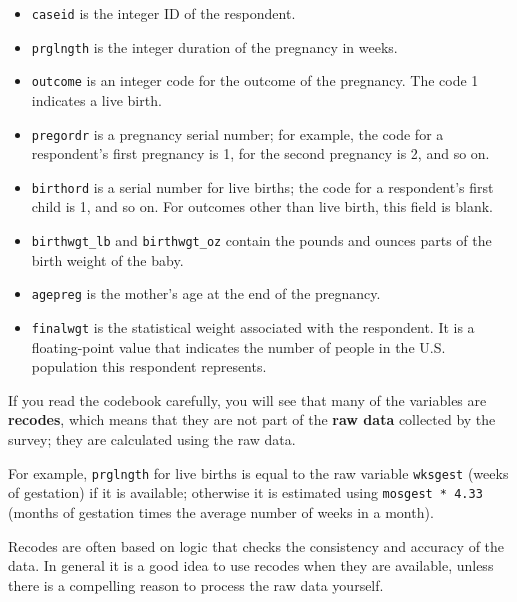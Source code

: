 \documentclass[12pt]{book}
\begin{document}
\begin{itemize}

\item \verb"caseid" is the integer ID of the respondent.

\item \verb"prglngth" is the integer duration of the pregnancy in weeks.

\item \verb"outcome" is an integer code for the outcome of the
  pregnancy.  The code 1 indicates a live birth.

\item \verb"pregordr" is a pregnancy serial number; for example, the
  code for a respondent's first pregnancy is 1, for the second
  pregnancy is 2, and so on.

\item \verb"birthord" is a serial number for live
  births; the code for a respondent's first child is 1, and so on.
  For outcomes other than live birth, this field is blank.

\item \verb"birthwgt_lb" and \verb"birthwgt_oz" contain the pounds and
  ounces parts of the birth weight of the baby.

\item \verb"agepreg" is the mother's age at the end of the pregnancy.

\item \verb"finalwgt" is the statistical weight associated with the
  respondent.  It is a floating-point value that indicates the number
  of people in the U.S. population this respondent represents.

\end{itemize}

If you read the codebook carefully, you will see that many of the
variables are {\bf recodes}, which means that they are not part of the
{\bf raw data} collected by the survey; they are calculated using
the raw data.   

For example, \verb"prglngth" for live births is equal to the raw
variable \verb"wksgest" (weeks of gestation) if it is available;
otherwise it is estimated using \verb"mosgest * 4.33" (months of
gestation times the average number of weeks in a month).

Recodes are often based on logic that checks the consistency and
accuracy of the data.  In general it is a good idea to use recodes
when they are available, unless there is a compelling reason to
process the raw data yourself.
\end{document}

